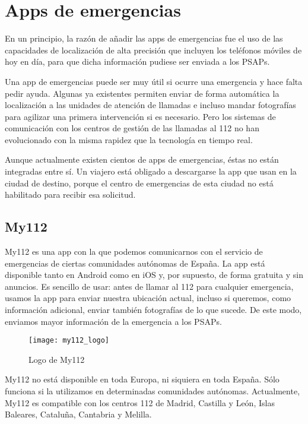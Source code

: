 \section{Apps de emergencias}

En un principio, la razón de añadir las apps de emergencias fue el uso de las capacidades de localización de alta precisión que incluyen los teléfonos móviles de hoy en día, para que dicha información pudiese ser enviada a los PSAPs.

Una app de emergencias puede ser muy útil si ocurre una emergencia y hace falta pedir ayuda. Algunas ya existentes permiten enviar de forma automática la localización a las unidades de atención de llamadas e incluso mandar fotografías para agilizar una primera intervención si es necesario. Pero los sistemas de comunicación con los centros de gestión de las llamadas al 112 no han evolucionado con la misma rapidez que la tecnología en tiempo real.

Aunque actualmente existen cientos de apps de emergencias, éstas no están integradas entre sí. Un viajero está obligado a descargarse la app que usan en la ciudad de destino, porque el centro de emergencias de esta ciudad no está habilitado para recibir esa solicitud.

\subsection{My112}

My112 es una app con la que podemos comunicarnos con el servicio de emergencias de ciertas comunidades autónomas de España. La app está disponible tanto en Android como en iOS y, por supuesto, de forma gratuita y sin anuncios. Es sencillo de usar: antes de llamar al 112 para cualquier emergencia, usamos la app para enviar nuestra ubicación actual, incluso si queremos, como información adicional, enviar también fotografías de lo que sucede. De este modo, enviamos mayor información de la emergencia a los PSAPs.

\begin{figure}[htp!]
  \centering
  \texttt{[image: my112\_logo]}
  \caption{Logo de My112}
  \label{fig:my112_logo}
\end{figure}

My112 no está disponible en toda Europa, ni siquiera en toda España. Sólo funciona si la utilizamos en determinadas comunidades autónomas. Actualmente, My112 es compatible con los centros 112 de Madrid, Castilla y León, Islas Baleares, Cataluña, Cantabria y Melilla.

